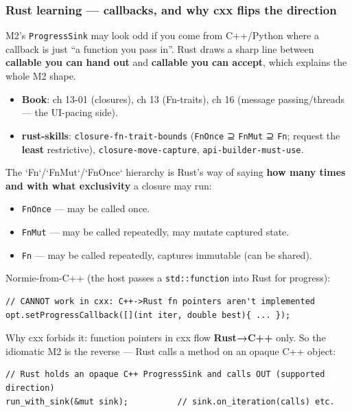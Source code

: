 \documentclass[11pt]{article}
\begin{document}
\subsubsection{Rust learning — callbacks, and why cxx flips the direction}
\label{sec:orgd845bec}

M2's \texttt{ProgressSink} may look odd if you come from C++/Python where a callback
is just ``a function you pass in''. Rust draws a sharp line between \textbf{callable
you can hand out} and \textbf{callable you can accept}, which explains the whole M2
shape.

\begin{itemize}
\item \textbf{\textbf{Book}}: ch 13-01 (closures), ch 13 (Fn-traits), ch 16 (message
passing/threads — the UI-pacing side).
\item \textbf{\textbf{rust-skills}}: \texttt{closure-fn-trait-bounds} (\texttt{FnOnce} ⊇ \texttt{FnMut} ⊇ \texttt{Fn};
request the \textbf{least} restrictive), \texttt{closure-move-capture},
\texttt{api-builder-must-use}.
\end{itemize}

The `Fn`/`FnMut`/`FnOnce` hierarchy is Rust's way of saying \textbf{how many times
and with what exclusivity} a closure may run:

\begin{itemize}
\item \texttt{FnOnce} — may be called once.
\item \texttt{FnMut} — may be called repeatedly, may mutate captured state.
\item \texttt{Fn} — may be called repeatedly, captures immutable (can be shared).
\end{itemize}

Normie-from-C++ (the host passes a \texttt{std::function} into Rust for progress):

\begin{verbatim}
// CANNOT work in cxx: C++->Rust fn pointers aren't implemented
opt.setProgressCallback([](int iter, double best){ ... });
\end{verbatim}

Why cxx forbids it: function pointers in cxx flow \textbf{\textbf{Rust→C++}} only. So the
idiomatic M2 is the reverse — Rust calls a method on an opaque C++ object:

\begin{verbatim}
// Rust holds an opaque C++ ProgressSink and calls OUT (supported direction)
run_with_sink(&mut sink);          // sink.on_iteration(calls) etc.
\end{verbatim}
\end{document}
